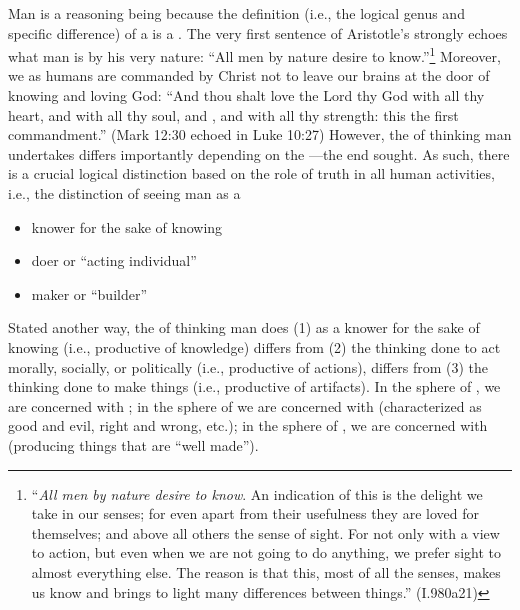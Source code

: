 Man is a reasoning being because the definition (i.e., the logical genus and specific difference) of a  is a . The very first sentence of Aristotle's  strongly echoes what man is by his very nature: ``All men by nature desire to know.''\footnote{``\emph{All men by nature desire to know}. An indication of this is the delight we take in our senses; for even apart from their usefulness they are loved for themselves; and above all others the sense of sight. For not only with a view to action, but even when we are not going to do anything, we prefer sight to almost everything else. The reason is that this, most of all the senses, makes us know and brings to light many differences between things.'' (I.980a21)} Moreover, we as humans are commanded by Christ not to leave our brains at the door of knowing and loving God: ``And thou shalt love the Lord thy God with all thy heart, and with all thy soul, and , and with all thy strength: this  the first commandment.'' (Mark 12:30 echoed in Luke 10:27) However, the  of thinking man undertakes differs importantly depending on the ---the end sought. As such, there is a crucial logical distinction based on the role of truth in all human activities, i.e., the distinction of seeing man as a

\begin{itemize}
\item knower for the sake of knowing
\item doer or ``acting individual''
\item maker or ``builder''
\end{itemize}

Stated another way, the  of thinking man does (1) as a knower for the sake of knowing (i.e., productive of knowledge) differs from (2) the thinking done to act morally, socially, or politically (i.e., productive of actions), differs from (3) the thinking done to make things (i.e., productive of artifacts). In the sphere of , we are concerned with ; in the sphere of  we are concerned with  (characterized as good and evil, right and wrong, etc.); in the sphere of , we are concerned with  (producing things that are ``well made'').

